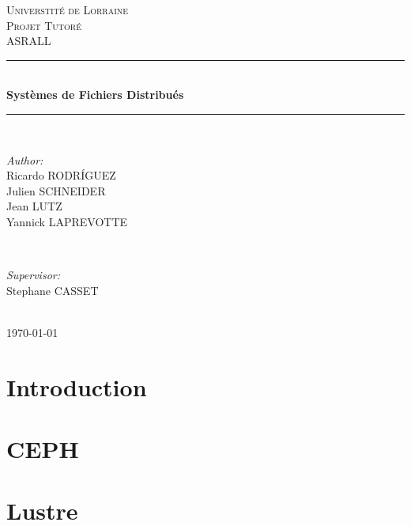 \documentclass[12pt]{article}
\begin{document}
\begin{titlepage}
\newcommand{\HRule}{\rule{\linewidth}{0.5mm}}
\center

\textsc{\LARGE Universtité de Lorraine}\\[1.5cm]
\textsc{\Large Projet Tutoré}\\[0.5cm]
\textsc{\large ASRALL}\\[0.5cm]

\HRule \\[0.4cm]
{ \huge \bfseries Systèmes de Fichiers Distribués}\\[0.4cm]
\HRule \\[1.5cm]

\begin{minipage}{0.4\textwidth}
\begin{flushleft} \large
\emph{Author:}\\
Ricardo \textsc{RODRÍGUEZ}\\
Julien \textsc{SCHNEIDER}\\
Jean \textsc{LUTZ}\\
Yannick \textsc{LAPREVOTTE}\\
\end{flushleft}
\end{minipage}
~
\begin{minipage}{0.4\textwidth}
\begin{flushright} \large
\emph{Supervisor:} \\
 Stephane \textsc{CASSET}
\end{flushright}
\end{minipage}\\[4cm]

{\large \today}\\[3cm]


\vfill

\end{titlepage}


\tableofcontents

\newpage 

\section{Introduction} 
\section{CEPH}
\newpage
\section{Lustre}
\end{document}
